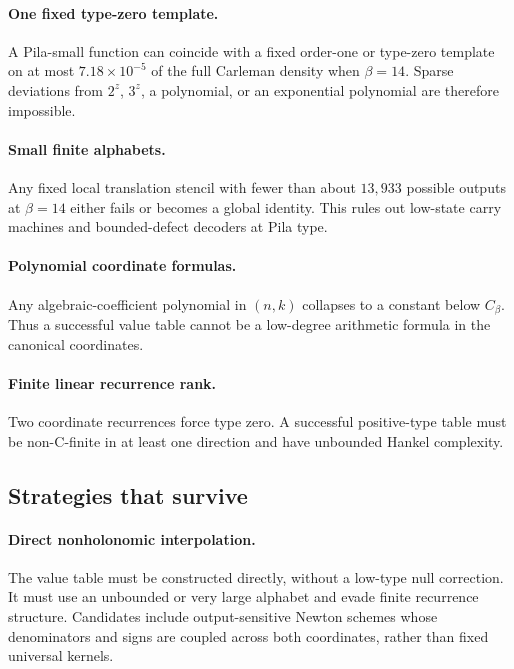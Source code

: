 \documentclass[11pt,oneside]{article}
\theoremstyle{definition}
\theoremstyle{remark}
\newcommand{\Cbeta}{C_\beta}
\begin{document}
\paragraph{One fixed type-zero template.}
A Pila-small function can coincide with a fixed order-one or type-zero template on at most
$7.18\times10^{-5}$ of the full Carleman density when $\beta=14$.  Sparse deviations from
$2^z$, $3^z$, a polynomial, or an exponential polynomial are therefore impossible.

\paragraph{Small finite alphabets.}
Any fixed local translation stencil with fewer than about $13{,}933$ possible outputs at
$\beta=14$ either fails or becomes a global identity.  This rules out low-state carry
machines and bounded-defect decoders at Pila type.

\paragraph{Polynomial coordinate formulas.}
Any algebraic-coefficient polynomial in $(n,k)$ collapses to a constant below $\Cbeta$.
Thus a successful value table cannot be a low-degree arithmetic formula in the canonical
coordinates.

\paragraph{Finite linear recurrence rank.}
Two coordinate recurrences force type zero.  A successful positive-type table must be
non-C-finite in at least one direction and have unbounded Hankel complexity.

\subsection{Strategies that survive}

\paragraph{Direct nonholonomic interpolation.}
The value table must be constructed directly, without a low-type null correction.  It must
use an unbounded or very large alphabet and evade finite recurrence structure.  Candidates
include output-sensitive Newton schemes whose denominators and signs are coupled across both
coordinates, rather than fixed universal kernels.
\end{document}

